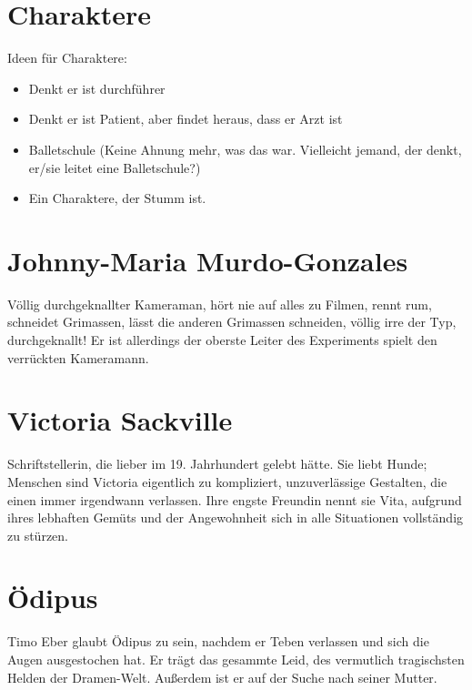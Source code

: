 \documentclass[12pt, a4paper, openany]{report}
\begin{document}
\section{Charaktere}
Ideen für Charaktere:
\begin{itemize}
\item Denkt er ist durchführer
\item Denkt er ist Patient, aber findet heraus, dass er Arzt ist
\item Balletschule (Keine Ahnung mehr, was das war. Vielleicht jemand, der denkt, er/sie leitet eine Balletschule?)
\item Ein Charaktere, der Stumm ist.
\end{itemize}

\section{Johnny-Maria Murdo-Gonzales}
Völlig durchgeknallter Kameraman, hört nie auf alles zu Filmen, rennt rum, schneidet Grimassen, lässt die anderen Grimassen schneiden, völlig irre der Typ, durchgeknallt! 
Er ist allerdings der oberste Leiter des Experiments \glqq spielt\grqq{} den verrückten Kameramann. 

\section{Victoria Sackville}
Schriftstellerin, die lieber im 19. Jahrhundert gelebt hätte. Sie liebt Hunde; Menschen sind Victoria eigentlich zu kompliziert, unzuverlässige Gestalten, die einen immer irgendwann verlassen. Ihre engste Freundin nennt sie Vita, aufgrund ihres lebhaften Gemüts und der Angewohnheit sich in alle Situationen vollständig zu stürzen.

\section{Ödipus}
Timo Eber glaubt Ödipus zu sein, nachdem er Teben verlassen und sich die Augen ausgestochen hat.
Er trägt das gesammte Leid, des vermutlich tragischsten Helden der Dramen-Welt.
Außerdem ist er auf der Suche nach seiner Mutter.
\end{document}
